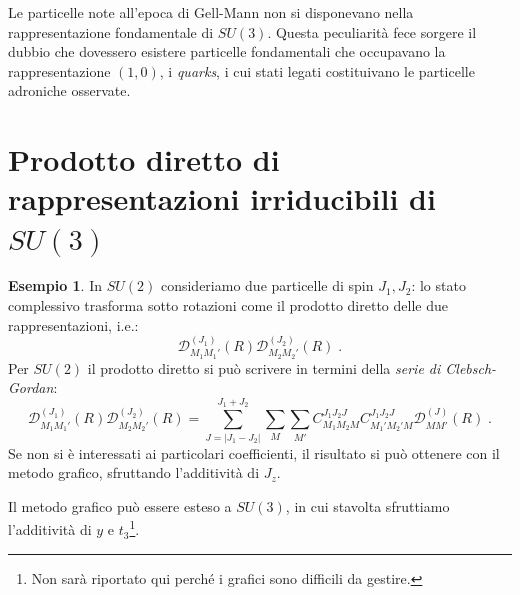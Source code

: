 \documentclass[12pt,a4paper]{article}
\theoremstyle{definition}
\newtheorem{exm}{Esempio}
\numberwithin{equation}{section}
\begin{document}
Le particelle note all'epoca di Gell-Mann non si disponevano nella rappresentazione fondamentale di $SU(3)$. Questa peculiarità fece sorgere il dubbio che dovessero esistere particelle fondamentali che occupavano la rappresentazione $(1,0)$, i \emph{quarks}, i cui stati legati costituivano le particelle adroniche osservate.
\cleardoublepage
\section{Prodotto diretto di rappresentazioni irriducibili di $SU(3)$}
\begin{exm}
In $SU(2)$ consideriamo due particelle di spin $J_1,J_2$: lo stato complessivo trasforma sotto rotazioni come il prodotto diretto delle due rappresentazioni, i.e.:
$$
\mathcal{D}^{(J_1)}_{M_1 M_1'}(R)\mathcal{D}^{(J_2)}_{M_2 M_2'}(R)\;.
$$
Per $SU(2)$ il prodotto diretto si può scrivere in termini della \emph{serie di Clebsch-Gordan}:
\begin{equation}
\mathcal{D}^{(J_1)}_{M_1 M_1'}(R)\mathcal{D}^{(J_2)}_{M_2 M_2'}(R)=\sum_{J=|J_1-J_2|}^{J_1+J_2}\sum_M\sum_{M'}C_{M_1M_2M}^{J_1J_2J}C_{M_1'M_2'M}^{J_1J_2J}\mathcal{D}^{(J)}_{MM'}(R)\;.
\end{equation}
Se non si è interessati ai particolari coefficienti, il risultato si può ottenere con il metodo grafico, sfruttando l'additività di $J_z$.
\end{exm}

Il metodo grafico può essere esteso a $SU(3)$, in cui stavolta sfruttiamo l'additività di $y$ e $t_3$\footnote{Non sarà riportato qui perché i grafici sono difficili da gestire.}.
\end{document}

